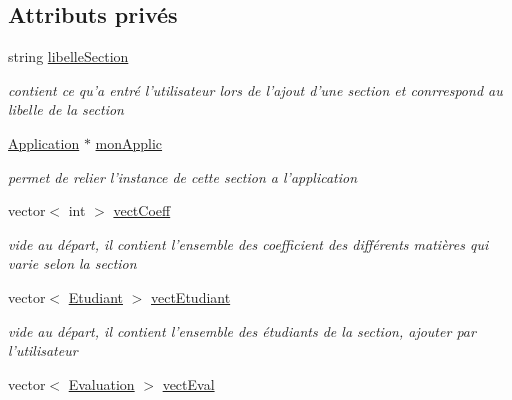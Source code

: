 \subsection*{Attributs privés}
\begin{DoxyCompactItemize}
\item 
\hypertarget{class_section_a8f6ad7b2f236367521e3578ed35ff3d5}{string \hyperlink{class_section_a8f6ad7b2f236367521e3578ed35ff3d5}{libelle\+Section}}\label{class_section_a8f6ad7b2f236367521e3578ed35ff3d5}

\begin{DoxyCompactList}\small\item\em contient ce qu'a entré l'utilisateur lors de l'ajout d'une section et conrrespond au libelle de la section \end{DoxyCompactList}\item 
\hypertarget{class_section_a387b69bedffb009e38d88cb272030bd4}{\hyperlink{class_application}{Application} $\ast$ \hyperlink{class_section_a387b69bedffb009e38d88cb272030bd4}{mon\+Applic}}\label{class_section_a387b69bedffb009e38d88cb272030bd4}

\begin{DoxyCompactList}\small\item\em permet de relier l'instance de cette section a l'application \end{DoxyCompactList}\item 
\hypertarget{class_section_a804c0479bba4cb92a12823c10e1e6944}{vector$<$ int $>$ \hyperlink{class_section_a804c0479bba4cb92a12823c10e1e6944}{vect\+Coeff}}\label{class_section_a804c0479bba4cb92a12823c10e1e6944}

\begin{DoxyCompactList}\small\item\em vide au départ, il contient l'ensemble des coefficient des différents matières qui varie selon la section \end{DoxyCompactList}\item 
\hypertarget{class_section_a878e894d29cdbecf573949260a3be53e}{vector$<$ \hyperlink{class_etudiant}{Etudiant} $>$ \hyperlink{class_section_a878e894d29cdbecf573949260a3be53e}{vect\+Etudiant}}\label{class_section_a878e894d29cdbecf573949260a3be53e}

\begin{DoxyCompactList}\small\item\em vide au départ, il contient l'ensemble des étudiants de la section, ajouter par l'utilisateur \end{DoxyCompactList}\item 
\hypertarget{class_section_ad1006e87bbe4c2ac441c12504cc16fa4}{vector$<$ \hyperlink{class_evaluation}{Evaluation} $>$ \hyperlink{class_section_ad1006e87bbe4c2ac441c12504cc16fa4}{vect\+Eval}}\label{class_section_ad1006e87bbe4c2ac441c12504cc16fa4}


\end{DoxyCompactItemize}
